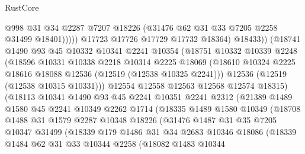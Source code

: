 \begin{lexlean}{RustCore}
\begin{coremodule}
                          @998
                          @31
                          @34
                          @2287
                          @7207
                          @18226
                          (@31476 @62 @31 @33 @7205 @2258 @31499 @18401)))))
                  @17723
                  @17726
                  @17729
                  @17732
                  @18364)
                @18433))
            (@18741
              @1490
              @93
              @45
              @10332
              @10341
              @2241
              @10354
              (@18751
                @10332
                @10339
                @2248
                (@18596
                  @10331
                  @10338
                  @2218
                  @10314
                  @2225
                  @18069
                  (@18610 @10324 @2225 @18616 @18088 @12536 (@12519 (@12538 @10325 @2241)))
                  @12536
                  (@12519 (@12538 @10315 @10331)))
                @12554
                @12558
                @12563
                @12568
                @12574
                @18315)
              (@18113
                @10341
                @1490
                @93
                @45
                @2241
                @10351
                @2241
                @2312
                (@21389
                  @1489
                  @1580
                  @45
                  @2241
                  @10349
                  @2262
                  @1714
                  (@18335
                    @1489
                    @1580
                    @10349
                    (@18708
                      @1488
                      @31
                      @1579
                      @2287
                      @10348
                      @18226
                      (@31476
                        @1487
                        @31
                        @35
                        @7205
                        @10347
                        @31499
                        (@18339
                          @179
                          @1486
                          @31
                          @34
                          @2683
                          @10346
                          @18086
                          (@18339
                            @1484
                            @62
                            @31
                            @33
                            @10344
                            @2258
                            (@18082
                              @1483
                              @10344

\end{coremodule}
\end{lexlean}
